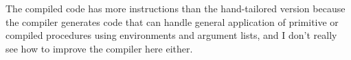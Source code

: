 \begin{exe}[5.45]
\begin{enumerate}
	    The compiled code has more instructions than the hand-tailored 
	    version because the compiler generates code that can handle general 
	    application of primitive or compiled procedures using environments 
	    and argument lists, and I don’t really see how to improve the 
	    compiler here either.
    \end{enumerate}
\end{exe}
